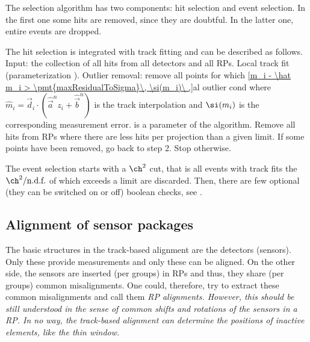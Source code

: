 The selection algorithm has two components: hit selection and event selection. In the first one some hits are removed, since they are doubtful. In the latter one, entire events are dropped.

The hit selection is integrated with track fitting and can be described as follows.
\bitm
\itm Input: the collection of all hits from all detectors and all RPs.
\itm Local track fit (parameterization ).
\itm Outlier removal: remove all points for which
\eqref{m_i - \hat m_i > \pmt{maxResidualToSigma}\, \si(m_i)\ ,}{al outlier cond}
where $\hat m_i = \vec d_i \cdot (\hat\vec a^n z_i + \hat\vec b^n)$ is the track interpolation and $\si(m_i)$ is the corresponding measurement error.  is a parameter of the algorithm.
\itm Remove all hits from RPs where there are less hits per projection than a given limit\break {}.
\itm If some points have been removed, go back to step 2. Stop otherwise.
\eitm

The event selection starts with a $\ch^2$ cut, that is all events with track fits the $\ch^2/\hbox{n.d.f.}$ of which exceeds a limit  are discarded. Then, there are few optional (they can be switched on or off) boolean checks, see .



\subsection[al rp fac]{Alignment of sensor packages}

The basic structures in the track-based alignment are the detectors (sensors). Only these provide measurements and only these can be aligned. On the other side, the sensors are inserted (per groups) in RPs and thus, they share (per groups) common misalignments. One could, therefore, try to extract these common misalignments and call them \em{RP alignments}. However, this should be still understood in the sense of common shifts and rotations of the sensors in a RP. In no way, the track-based alignment can determine the positions of inactive elements, like the thin window.


